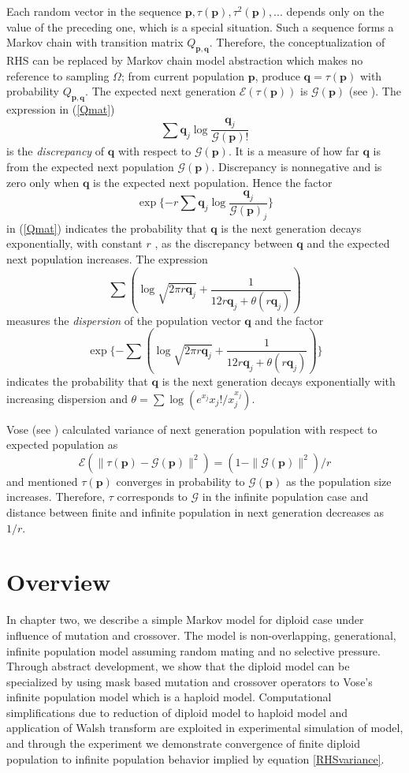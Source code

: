 Each random vector in the sequence $\bm{p}, \tau(\bm{p}), \tau^2(\bm{p}),...$ depends only on the value of the preceding one, 
which is a special situation. Such a sequence forms a Markov chain with transition matrix $Q_{\bm{p},\bm{q}}$. Therefore, 
the conceptualization of RHS can be replaced by Markov chain model abstraction which makes no reference to sampling $\Omega$; 
from current population $\bm{p}$, produce $\bm{q} = \tau (\bm{p})$ with probability $Q_{\bm{p},\bm{q}}$. The expected next generation 
$\mathcal{E}(\tau (\bm{p}))$ is $\mathcal{G}(\bm{p})$ (see \cite{Vose1999}). The expression in (\ref{Qmat})
\[
\sum \bm{q}_j \log \frac{\bm{q}_j}{\mathcal{G}(\bm{p})!}
\]
is the {\em discrepancy} of $\bm{q}$ with respect to $\mathcal{G}(\bm{p})$. It is a measure of how far $\bm{q}$ is from the expected next population 
$\mathcal{G}(\bm{p})$. Discrepancy is nonnegative and is zero only when $\bm{q}$ is the expected next population. Hence the factor 
\[
\exp\{-r \sum \bm{q}_j \log \frac{\bm{q}_j}{\mathcal{G}(\bm{p})_j}\}
\]
in (\ref{Qmat}) indicates the probability that $\bm{q}$ is the next generation
decays exponentially, with constant $r$ , as the discrepancy between $\bm{q}$ and the
expected next population increases.
The expression 
\[
\sum (\log \sqrt{2 \pi r\bm{q}_j} + \frac{1}{12r\bm{q}_j + \theta (r\bm{q}_j)})
\]
measures the {\em dispersion} of the population vector $\bm{q}$ and the factor
\[
\exp\{- \sum (\log \sqrt{2 \pi r\bm{q}_j} + \frac{1}{12r\bm{q}_j + \theta (r\bm{q}_j)})\}
\]
indicates the probability that $\bm{q}$ is the next generation decays exponentially with increasing dispersion and 
$\theta  =  \sum \log(e^{x_j}x_j!/x_j^{x_j})$.

Vose (see \cite{Vose1999}) calculated variance of next generation population with respect to expected population as 
\begin{equation}
\label{RHSvariance}
\mathcal{E}(\| \tau (\bm{p}) - \mathcal{G}(\bm{p}) \|^2) = (1 - \|\mathcal{G}(\bm{p})\|^2) / r
\end{equation}
and mentioned $\tau (\bm{p})$ converges in probability to $\mathcal{G}(\bm{p})$ as the population size increases. Therefore, $\tau$ corresponds to $\mathcal{G}$ in the infinite
population case and distance between finite and infinite population in next generation decreases as $1/r$.

\section{Overview}
In chapter two, we describe a simple Markov model for diploid case under influence of mutation and crossover. The model is non-overlapping, generational, infinite population model assuming random mating and no selective pressure. Through abstract development, we show that the diploid model can be specialized by using mask based mutation and crossover operators to Vose's infinite population model which is a haploid model. Computational simplifications due to reduction of diploid model to haploid model and application of Walsh transform are exploited in experimental simulation of model, and through the experiment we demonstrate convergence of finite diploid population to infinite population behavior implied by equation \ref{RHSvariance}.

